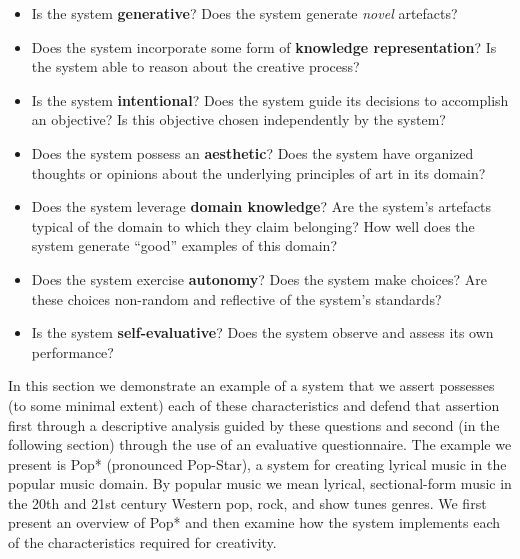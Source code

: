 \documentclass[phd,electronic,oneside,twosidetoc,letterpaper,chaptercenter,parttop,lol,lof,lot]{byumsphd}
\begin{document}
\begin{itemize}
\item Is the system \textbf{generative}? Does the system generate \textit{novel} artefacts?
\item Does the system incorporate some form of \textbf{knowledge representation}? Is the system able to reason about the creative process?
\item Is the system \textbf{intentional}? Does the system guide its decisions to accomplish an objective? Is this objective chosen independently by the system?
\item Does the system possess an \textbf{aesthetic}? Does the system have organized thoughts or opinions about the underlying principles of art in its domain?
\item Does the system leverage \textbf{domain knowledge}? Are the system's artefacts typical of the domain to which they claim belonging? How well does the system generate ``good'' examples of this domain?
\item Does the system exercise \textbf{autonomy}? Does the system make choices? Are these choices non-random and reflective of the system's standards?
\item Is the system \textbf{self-evaluative}? Does the system observe and assess its own performance?
\end{itemize}

In this section we demonstrate an example of a system that we assert possesses (to some minimal extent) each of these characteristics and defend that assertion first through a descriptive analysis guided by these questions and second (in the following section) through the use of an evaluative questionnaire. The example we present is Pop* (pronounced Pop-Star), a system for creating lyrical music in the popular music domain. By popular music we mean lyrical, sectional-form music in the 20th and 21st century Western pop, rock, and show tunes genres. We first present an overview of Pop* and then examine how the system implements each of the characteristics required for creativity.
\end{document}

